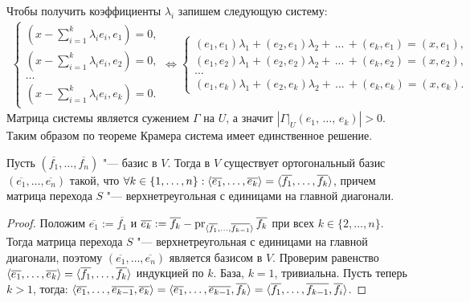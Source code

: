 \begin{algorithm}
\begin{enumerate}
        Чтобы получить коэффициенты $\lambda_i$ запишем следующую систему:
        \begin{eqnarray*}
            \begin{cases*}
                (x - \displaystyle\sum_{i=1}^{k} \lambda_i e_i, e_1) = 0,
                \\
                (x - \displaystyle\sum_{i=1}^{k} \lambda_i e_i, e_2) = 0,
                \\
                \dots
                \\
                (x - \displaystyle\sum_{i=1}^{k} \lambda_i e_i, e_k) = 0.
            \end{cases*} \Leftrightarrow \begin{cases*}
                (e_1, e_1) \lambda_1 + (e_2, e_1) \lambda_2 + \, ... \, + (e_k, e_1) = (x, e_1),
                \\
                (e_1, e_2) \lambda_1 + (e_2, e_2) \lambda_2 + \, ... \, + (e_k, e_2) = (x, e_2),
                \\
                \dots
                \\
                (e_1, e_k) \lambda_1 + (e_2, e_k) \lambda_2 + \, ... \, + (e_k, e_k) = (x, e_k).
            \end{cases*}
        \end{eqnarray*}
        Матрица системы является сужением $\Gamma$ на $U$, а значит $|\Gamma \vert_{U} (e_1, \, \dots, \, e_k)| > 0$.
        Таким образом по теореме Крамера система имеет единственное решение.
    \end{enumerate}
\end{algorithm}

\begin{theorem}
	Пусть $(\overline{f_1}, \dots, \overline{f_n})$ "--- базис в $V$. Тогда в $V$ существует ортогональный базис $(\overline{e_1}, \dots, \overline{e_n})$ такой, что $\forall k \hm{\in} \{1, \dots, n\}: \langle\overline{e_1}, \dots, \overline{e_k}\rangle \hm= \langle\overline{f_1}, \dots, \overline{f_k}\rangle$, причем матрица перехода $S$ "--- верхнетреугольная с единицами на главной диагонали.
\end{theorem}

\begin{proof}
	Положим $\overline{e_1} := \overline{f_1}$ и $\overline{e_k} := \overline{f_k} \hm{-} \pr_{\langle\overline{f_1}, \dots, \overline{f_{k - 1}}\rangle}\overline{f_k}$ при всех $k \in \{2, \dots, n\}$. Тогда матрица перехода $S$ "--- верхнетреугольная с единицами на главной диагонали, поэтому $(\overline{e_1}, \dotsc, \overline{e_n})$ является базисом в $V$. Проверим равенство $\langle\overline{e_1}, \dots, \overline{e_k}\rangle \hm= \langle\overline{f_1}, \dots, \overline{f_k}\rangle$ индукцией по $k$. База, $k = 1$, тривиальна. Пусть теперь $k > 1$, тогда: $\langle\overline{e_1}, \dots, \overline{e_{k-1}}, \overline{e_k}\rangle \hm= \langle\overline{e_1}, \dots, \overline{e_{k-1}}, \overline{f_k}\rangle = \langle\overline{f_1}, \dots, \overline{f_{k-1}}, \overline{f_i}\rangle$.
\end{proof}

